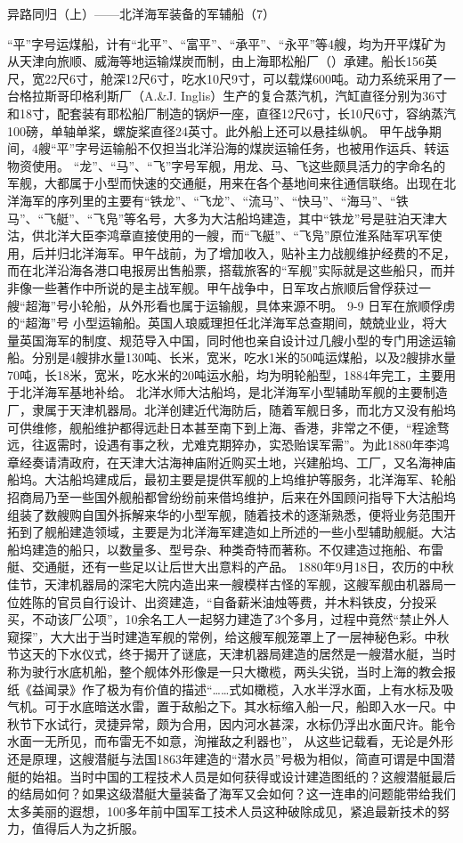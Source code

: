 \documentclass[12pt,UTF8]{ctexbook}
\begin{document}
异路同归（上）——北洋海军装备的军辅船（7）

“平”字号运煤船，计有“北平”、“富平”、“承平”、“永平”等4艘，均为开平煤矿为从天津向旅顺、威海等地运输煤炭而制，由上海耶松船厂（）承建。船长156英尺，宽22尺6寸，舱深12尺6寸，吃水10尺9寸，可以载煤600吨。动力系统采用了一台格拉斯哥印格利斯厂（A.\&J. Inglis）生产的复合蒸汽机，汽缸直径分别为36寸和18寸，配套装有耶松船厂制造的锅炉一座，直径12尺6寸，长10尺6寸，容纳蒸汽100磅，单轴单桨，螺旋桨直径24英寸。此外船上还可以悬挂纵帆。 甲午战争期间，4艘“平”字号运输船不仅担当北洋沿海的煤炭运输任务，也被用作运兵、转运物资使用。
“龙”、“马”、“飞”字号军舰，用龙、马、飞这些颇具活力的字命名的军舰，大都属于小型而快速的交通艇，用来在各个基地间来往通信联络。出现在北洋海军的序列里的主要有“铁龙”、“飞龙”、“流马”、“快马”、“海马”、“铁马”、“飞艇”、“飞凫”等名号，大多为大沽船坞建造，其中“铁龙”号是驻泊天津大沽，供北洋大臣李鸿章直接使用的一艘，而“飞艇”、“飞凫”原位淮系陆军巩军使用，后并归北洋海军。甲午战前，为了增加收入，贴补主力战舰维护经费的不足，而在北洋沿海各港口电报房出售船票，搭载旅客的“军舰”实际就是这些船只，而并非像一些著作中所说的是主战军舰。甲午战争中，日军攻占旅顺后曾俘获过一艘“超海”号小轮船，从外形看也属于运输舰，具体来源不明。
9-9 日军在旅顺俘虏的“超海”号
小型运输船。英国人琅威理担任北洋海军总查期间，兢兢业业，将大量英国海军的制度、规范导入中国，同时他也亲自设计过几艘小型的专门用途运输船。分别是4艘排水量130吨、长米，宽米，吃水1米的50吨运煤船，以及2艘排水量70吨，长18米，宽米，吃水米的20吨运水船，均为明轮船型，1884年完工，主要用于北洋海军基地补给。
北洋水师大沽船坞，是北洋海军小型辅助军舰的主要制造厂，隶属于天津机器局。北洋创建近代海防后，随着军舰日多，而北方又没有船坞可供维修，舰船维护都得远赴日本甚至南下到上海、香港，非常之不便，“程途骛远，往返需时，设遇有事之秋，尤难克期猝办，实恐贻误军需”。为此1880年李鸿章经奏请清政府，在天津大沽海神庙附近购买土地，兴建船坞、工厂，又名海神庙船坞。大沽船坞建成后，最初主要是提供军舰的上坞维护等服务，北洋海军、轮船招商局乃至一些国外舰船都曾纷纷前来借坞维护，后来在外国顾问指导下大沽船坞组装了数艘购自国外拆解来华的小型军舰，随着技术的逐渐熟悉，便将业务范围开拓到了舰船建造领域，主要是为北洋海军建造如上所述的一些小型辅助舰艇。大沽船坞建造的船只，以数量多、型号杂、种类奇特而著称。不仅建造过拖船、布雷艇、交通艇，还有一些足以让后世大出意料的产品。
1880年9月18日，农历的中秋佳节，天津机器局的深宅大院内造出来一艘模样古怪的军舰，这艘军舰由机器局一位姓陈的官员自行设计、出资建造，“自备薪米油烛等费，并木料铁皮，分投采买，不动该厂公项”，10余名工人一起努力建造了3个多月，过程中竟然“禁止外人窥探”，大大出于当时建造军舰的常例，给这艘军舰笼罩上了一层神秘色彩。中秋节这天的下水仪式，终于揭开了谜底，天津机器局建造的居然是一艘潜水艇，当时称为驶行水底机船，整个舰体外形像是一只大橄榄，两头尖锐，当时上海的教会报纸《益闻录》作了极为有价值的描述“……式如橄榄，入水半浮水面，上有水标及吸气机。可于水底暗送水雷，置于敌船之下。其水标缩入船一尺，船即入水一尺。中秋节下水试行，灵捷异常，颇为合用，因内河水甚深，水标仍浮出水面尺许。能令水面一无所见，而布雷无不如意，洵摧敌之利器也”， 从这些记载看，无论是外形还是原理，这艘潜艇与法国1863年建造的“潜水员”号极为相似，简直可谓是中国潜艇的始祖。当时中国的工程技术人员是如何获得或设计建造图纸的？这艘潜艇最后的结局如何？如果这级潜艇大量装备了海军又会如何？这一连串的问题能带给我们太多美丽的遐想，100多年前中国军工技术人员这种破除成见，紧追最新技术的努力，值得后人为之折服。
\end{document}
